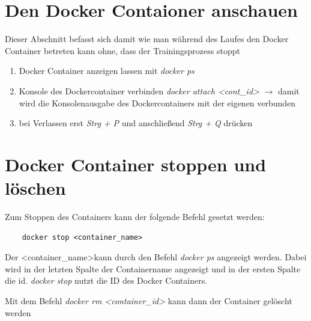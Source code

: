 \section{Den Docker Contaioner anschauen}
Dieser Abschnitt befasst sich damit wie man während des Laufes den Docker Container betreten kann ohne, dass der Trainingsprozess stoppt
\begin{enumerate}
    \item Docker Container anzeigen lassen mit \textit{docker ps}
    \item Konsole des Dockercontainer verbinden \textit{docker attach \textless cont\_id\textgreater} $\rightarrow$ damit wird die Konsolenausgabe des Dockercontainers mit der eigenen verbunden
    \item bei Verlassen erst \textit{Strg + P} und anschließend \textit{Strg + Q} drücken 
\end{enumerate}

\section{Docker Container stoppen und löschen}
Zum Stoppen des Containers kann der folgende Befehl gesetzt werden:
\begin{verbatim}
    docker stop <container_name>
\end{verbatim}
Der \textless container\_name\textgreater kann durch den Befehl \textit{docker ps} angezeigt werden. Dabei wird in der letzten Spalte der Containername angezeigt und in der ersten Spalte die id. \textit{docker stop} nutzt die ID des Docker Containers.

Mit dem Befehl \textit{docker rm \textless container\_id\textgreater} kann dann der Container gelöscht werden 